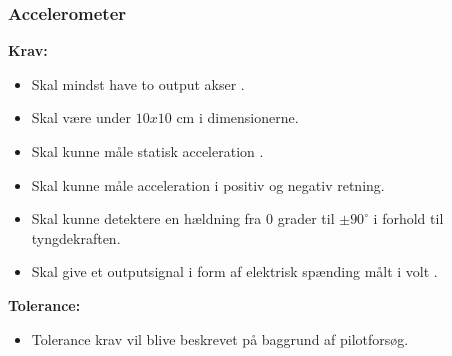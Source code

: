 \subsubsection{Accelerometer}
\textbf{Krav:}
\begin{itemize}
\item Skal mindst have to output akser .
\item Skal være under $10x10$ cm i dimensionerne.
\item Skal kunne måle statisk acceleration .
\item Skal kunne måle acceleration i positiv og negativ retning.
\item Skal kunne detektere en hældning fra 0 grader til $\pm 90^{\circ}$ i forhold til tyngdekraften.
\item Skal give et outputsignal  i form af elektrisk spænding målt i volt .
\end{itemize}
\textbf{Tolerance:}
\begin{itemize}
\item Tolerance krav vil blive beskrevet på baggrund af pilotforsøg.
\end{itemize}

